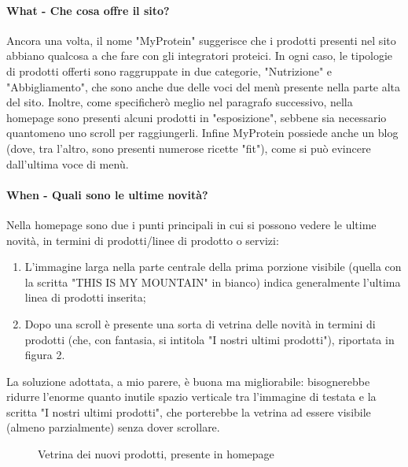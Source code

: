 \paragraph{What - Che cosa offre il sito?}
Ancora una volta, il nome "MyProtein" suggerisce che i prodotti presenti nel sito abbiano qualcosa a che fare con gli integratori proteici. In ogni caso, le tipologie di prodotti offerti sono raggruppate in due categorie, "Nutrizione" e "Abbigliamento", che sono anche due delle voci del menù presente nella parte alta del sito. Inoltre, come specificherò meglio nel paragrafo successivo, nella homepage sono presenti alcuni prodotti in "esposizione", sebbene sia necessario quantomeno uno scroll per raggiungerli. Infine MyProtein possiede anche un blog (dove, tra l'altro, sono presenti numerose ricette "fit"), come si può evincere dall'ultima voce di menù.
\paragraph{When - Quali sono le ultime novità?}
Nella homepage sono due i punti principali in cui si possono vedere le ultime novità, in termini di prodotti/linee di prodotto o servizi:
\begin{enumerate}
	\item L'immagine larga nella parte centrale della prima porzione visibile (quella con la scritta "THIS IS MY MOUNTAIN" in bianco) indica generalmente l'ultima linea di prodotti inserita;
	\item Dopo una scroll è presente una sorta di vetrina delle novità in termini di prodotti (che, con fantasia, si intitola "I nostri ultimi prodotti"), riportata in figura 2.
\end{enumerate}
La soluzione adottata, a mio parere, è buona ma migliorabile: bisognerebbe ridurre l'enorme quanto inutile spazio verticale tra l'immagine di testata e la scritta "I nostri ultimi prodotti", che porterebbe la vetrina ad essere visibile (almeno parzialmente) senza dover scrollare.

\begin{figure}[!htb]
	\caption{\label{fig:figura3} Vetrina dei nuovi prodotti, presente in homepage}
\end{figure}

